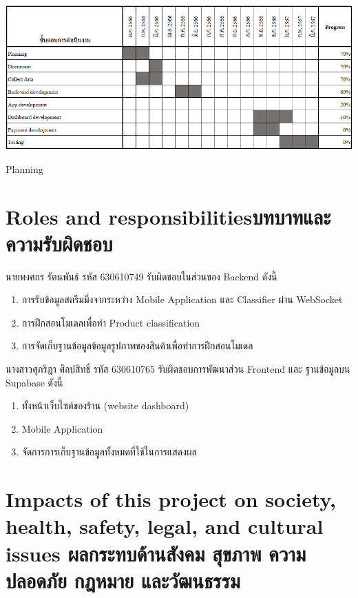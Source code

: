     \begin{table}[h]
        \begin{center}
      
        \vspace{0.5cm}\includegraphics[scale=0.64]{pic/plane.png}
        \end{center}
        
        \caption[Planning]{Planning}
        \label{table:Planning}
        \end{table}

\newpage
\section{\ifenglish Roles and responsibilities\else บทบาทและความรับผิดชอบ\fi}
นายพงศกร รัตนพันธ์ รหัส 630610749 รับผิดชอบในส่วนของ Backend ดังนี้

\begin{enumerate}
    \item การรับข้อมูลสตรีมมิ่งจากระหว่าง Mobile Application และ  Classifier ผ่าน WebSocket
    \item การฝึกสอนโมเดลเพื่อทำ Product classification
    \item การจัดเก็บฐานข้อมูลข้อมูลรูปภาพของสินค้าเพื่อทำการฝึกสอนโมเดล
\end{enumerate}


นางสาวศุภริฎา  ศิลปสิทธิ์ รหัส 630610765 รับผิดชอบการพัฒนาส่วน Frontend และ ฐานข้อมูลบน Supabase ดังนี้
\begin{enumerate}
    \item ทั้งหน้าเว็บไซต์ของร้าน (website dashboard) 
    \item Mobile Application
    \item จัดการการเก็บฐานข้อมูลทั้งหมดที่ใช้ในการแสดงผล
\end{enumerate}
\section{\ifenglish%
Impacts of this project on society, health, safety, legal, and cultural issues
\else%
ผลกระทบด้านสังคม สุขภาพ ความปลอดภัย กฎหมาย และวัฒนธรรม
\fi}

